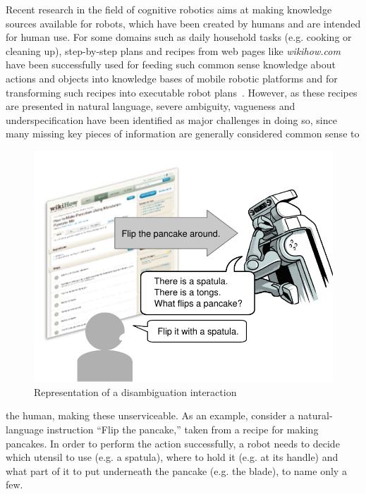 \documentclass[oribibl]{llncs}
\begin{document}
Recent research in the field of cognitive robotics aims at making 
knowledge sources available for robots, which have been created by 
humans and are intended for human use. For some domains such as 
daily household tasks (e.g. cooking or cleaning up), step-by-step 
plans and recipes from web pages like \textit 
{wikihow.com} have been successfully used for feeding such common 
sense knowledge about actions and objects into knowledge bases of 
mobile robotic platforms and for transforming such recipes into 
executable robot plans~\cite{tenorth10webinstructions}. However, as 
these recipes are presented in natural language, severe ambiguity, 
vagueness and underspecification have been identified as major 
challenges in doing so, since many missing 
key pieces of information are generally considered common sense to 
\begin{figure}[t]
\centering
\includegraphics[scale=0.51, trim = 0mm 0mm 0mm 8mm]{human_robot.pdf}
\caption{Representation of a disambiguation interaction}
\label{fig:application}
\end{figure} 
the human, making these unserviceable.
As an example, consider a natural-language instruction ``Flip the 
pancake,'' taken from a recipe for making pancakes. 
In order to perform the action successfully, a robot needs to decide 
which utensil to use (e.g. a spatula), where to hold it (e.g. at its 
handle) and what part of it to put underneath the pancake (e.g. the 
blade), to name only a few.
\end{document}

